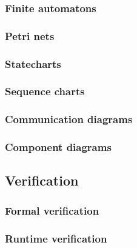     \subsubsection{Finite automatons}
    \subsubsection{Petri nets}
    \subsubsection{Statecharts}
    \subsubsection{Sequence charts}
    \subsubsection{Communication diagrams}
    \subsubsection{Component diagrams}
  \subsection{Verification}
    \subsubsection{Formal verification}
    \subsubsection{Runtime verification}